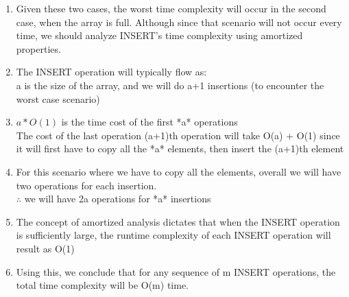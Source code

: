 \documentclass[11pt]{article}
\begin{document}
\begin{enumerate}
\begin{enumerate}
\begin{enumerate}
\begin{enumerate}
                    \item Given these two cases, the worst time complexity will occur in the second case, when the array is full. Although since that scenario will not occur every time, we should analyze INSERT's time complexity using amortized properties.
                    \item The INSERT operation will typically flow as: \\
                    a is the size of the array, and we will do a+1 insertions (to encounter the worst case scenario)
                    \item $a * O(1)$ is the time cost of the first *a* operations\\
                    The cost of the last operation (a+1)th operation will take O(a) + O(1) since it will first have to copy all the *a* elements, then insert the (a+1)th element
                    \item For this scenario where we have to copy all the elements, overall we will have two operations for each insertion. \\
                    $\therefore$ we will have 2a operations for *a* insertions
                    \item The concept of amortized analysis dictates that when the INSERT operation is sufficiently large, the runtime complexity of each INSERT operation will result as O(1)
                    \item Using this, we conclude that for any sequence of m INSERT operations, the total time complexity will be O(m) time. 
                    

\end{enumerate}
\end{enumerate}
\end{enumerate}
\end{enumerate}
\end{document}
